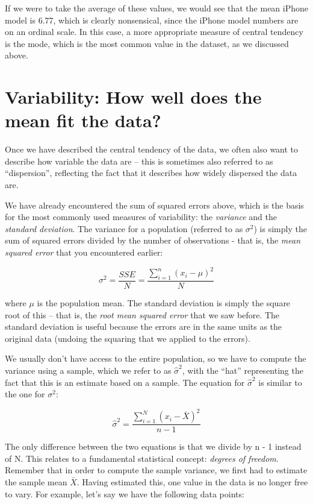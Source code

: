 \documentclass[]{book}
\theoremstyle{definition}
\theoremstyle{definition}
\theoremstyle{definition}
\theoremstyle{remark}
\begin{document}
If we were to take the average of these values, we would see that the
mean iPhone model is 6.77, which is clearly nonsensical, since the
iPhone model numbers are on an ordinal scale. In this case, a more
appropriate measure of central tendency is the mode, which is the most
common value in the dataset, as we discussed above.

\section{Variability: How well does the mean fit the
data?}\label{variability-how-well-does-the-mean-fit-the-data}

Once we have described the central tendency of the data, we often also
want to describe how variable the data are -- this is sometimes also
referred to as ``dispersion'', reflecting the fact that it describes how
widely dispersed the data are.

We have already encountered the sum of squared errors above, which is
the basis for the most commonly used measures of variability: the
\emph{variance} and the \emph{standard deviation}. The variance for a
population (referred to as \(\sigma^2\)) is simply the sum of squared
errors divided by the number of observations - that is, the \emph{mean
squared error} that you encountered earlier:

\[
\sigma^2 = \frac{SSE}{N} = \frac{\sum_{i=1}^n (x_i - \mu)^2}{N}
\]

where \(\mu\) is the population mean. The standard deviation is simply
the square root of this -- that is, the \emph{root mean squared error}
that we saw before. The standard deviation is useful because the errors
are in the same units as the original data (undoing the squaring that we
applied to the errors).

We usually don't have access to the entire population, so we have to
compute the variance using a sample, which we refer to as
\(\hat{\sigma}^2\), with the ``hat'' representing the fact that this is
an estimate based on a sample. The equation for \(\hat{\sigma}^2\) is
similar to the one for \(\sigma^2\):

\[
\hat{\sigma}^2 = \frac{\sum_{i=1}^N (x_i - \bar{X})^2}{n-1}
\]

The only difference between the two equations is that we divide by n - 1
instead of N. This relates to a fundamental statistical concept:
\emph{degrees of freedom}. Remember that in order to compute the sample
variance, we first had to estimate the sample mean \(\bar{X}\). Having
estimated this, one value in the data is no longer free to vary. For
example, let's say we have the following data points:
\end{document}
